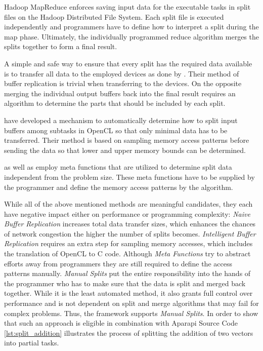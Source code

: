 \begin{description}[style=nextline]
	\item [Manual Splits]
	Hadoop MapReduce enforces saving input data for the executable tasks in split files on the Hadoop Distributed File System. Each split file is executed independently and programmers have to define how to interpret a split during the map phase. Ultimately, the individually programmed reduce algorithm merges the splits together to form a final result.

	\item [Naive Buffer Replication]
	A simple and safe way to ensure that every split has the required data available is to transfer all data to the employed devices as done by \citeauthor{delalama_2012}\cite{delalama_2012}. Their method of buffer replication is trivial when transferring to the devices. On the opposite merging the individual output buffers back into the final result requires an algorithm to determine the parts that should be included by each split.

	\item [Intelligent Buffer Replication]
	\citeauthor{Kim_2011}\cite{Kim_2011} have developed a mechanism to automatically determine how to split input buffers among subtasks in OpenCL so that only minimal data has to be transferred. Their method is based on sampling memory access patterns before sending the data so that lower and upper memory bounds can be determined.

	\item [Meta Functions]
	\citeauthor{stepocl}\cite{stepocl} as well as \citeauthor{distcl}\cite{distcl} employ meta functions that are utilized to determine split data independent from the problem size. These meta functions have to be supplied by the programmer and define the memory access patterns by the algorithm.

\end{description}

While all of the above mentioned methods are meaningful candidates, they each have negative impact either on performance or programming complexity: \textit{Naive Buffer Replication} increases total data transfer sizes, which enhances the chances of network congestion the higher the number of splits becomes. \textit{Intelligent Buffer Replication} requires an extra step for sampling memory accesses, which includes the translation of OpenCL to C code. Although \textit{Meta Functions} try to abstract efforts away from programmers they are still required to define the access patterns manually. \textit{Manual Splits} put the entire responsibility into the hands of the programmer who has to make sure that the data is split and merged back together. While it is the least automated method, it also grants full control over performance and is not dependent on split and merge algorithms that may fail for complex problems. Thus, the framework supports \textit{Manual Splits}. In order to show that such an approach is eligible in combination with Aparapi Source Code \ref{lst:split_addition} illustrates the process of splitting the addition of two vectors into partial tasks.


